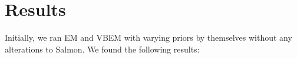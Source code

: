 \section{Results}
Initially, we ran EM and VBEM with varying priors by themselves without any alterations to Salmon. We found the following results:
